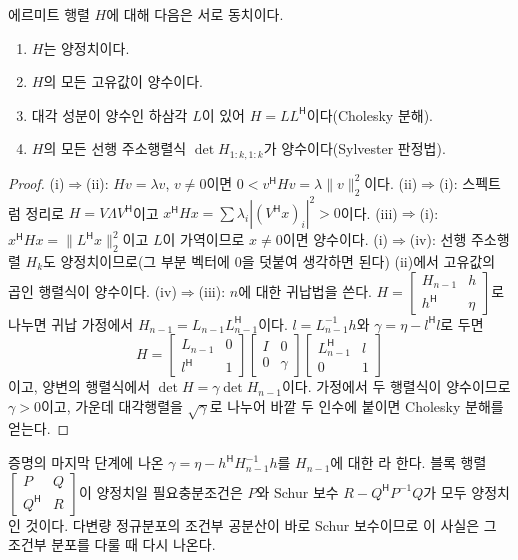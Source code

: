 \begin{theorem}
\label{thm:pd}
에르미트 행렬 $H$에 대해 다음은 서로 동치이다.
\begin{enumerate}
\item $H$는 양정치이다.
\item $H$의 모든 고유값이 양수이다.
\item 대각 성분이 양수인 하삼각 $L$이 있어 $H=LL^{\mathsf H}$이다(Cholesky 분해).
\item $H$의 모든 선행 주소행렬식 $\det H_{1:k,1:k}$가 양수이다(Sylvester 판정법).
\end{enumerate}
\end{theorem}

\begin{proof}
(i)$\Rightarrow$(ii): $Hv=\lambda v$, $v\ne0$이면 $0<v^{\mathsf H}Hv=\lambda\|v\|_2^2$이다. (ii)$\Rightarrow$(i): 스펙트럼 정리로 $H=V\Lambda V^{\mathsf H}$이고 $x^{\mathsf H}Hx=\sum\lambda_i|(V^{\mathsf H}x)_i|^2>0$이다. (iii)$\Rightarrow$(i): $x^{\mathsf H}Hx=\|L^{\mathsf H}x\|_2^2$이고 $L$이 가역이므로 $x\ne0$이면 양수이다. (i)$\Rightarrow$(iv): 선행 주소행렬 $H_k$도 양정치이므로(그 부분 벡터에 $0$을 덧붙여 생각하면 된다) (ii)에서 고유값의 곱인 행렬식이 양수이다. (iv)$\Rightarrow$(iii): $n$에 대한 귀납법을 쓴다. $H=\begin{bmatrix}H_{n-1}&h\\h^{\mathsf H}&\eta\end{bmatrix}$로 나누면 귀납 가정에서 $H_{n-1}=L_{n-1}L_{n-1}^{\mathsf H}$이다. $l=L_{n-1}^{-1}h$와 $\gamma=\eta-l^{\mathsf H}l$로 두면
\[
H=\begin{bmatrix}L_{n-1}&0\\l^{\mathsf H}&1\end{bmatrix}\begin{bmatrix}I&0\\0&\gamma\end{bmatrix}\begin{bmatrix}L_{n-1}^{\mathsf H}&l\\0&1\end{bmatrix}
\]
이고, 양변의 행렬식에서 $\det H=\gamma\det H_{n-1}$이다. 가정에서 두 행렬식이 양수이므로 $\gamma>0$이고, 가운데 대각행렬을 $\sqrt\gamma$로 나누어 바깥 두 인수에 붙이면 Cholesky 분해를 얻는다.
\end{proof}

증명의 마지막 단계에 나온 $\gamma=\eta-h^{\mathsf H}H_{n-1}^{-1}h$를 $H_{n-1}$에 대한 라 한다. 블록 행렬 $\begin{bmatrix}P&Q\\Q^{\mathsf H}&R\end{bmatrix}$이 양정치일 필요충분조건은 $P$와 Schur 보수 $R-Q^{\mathsf H}P^{-1}Q$가 모두 양정치인 것이다. 다변량 정규분포의 조건부 공분산이 바로 Schur 보수이므로 이 사실은 그 조건부 분포를 다룰 때 다시 나온다.

